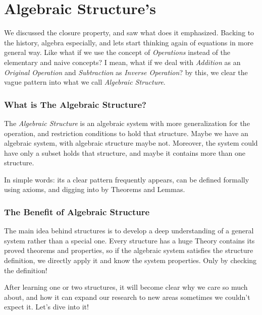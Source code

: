 \section{Algebraic Structure's}
We discussed the closure property, and saw what does it emphasized. Backing to the history, algebra especially, and lets start thinking again of equations in more general way. Like what if we use the concept of {\it Operations} instead of the elementary and naive concepts? I mean, what if we deal with {\it Addition} as an {\it Original Operation} and {\it Subtraction} as {\it Inverse Operation}? by this, we clear the vague pattern into what we call {\it Algebraic Structure}.

\subsubsection{What is The Algebraic Structure?}
The {\it Algebraic Structure} is an algebraic system with more generalization for the operation, and restriction conditions to hold that structure. Maybe we have an algebraic system, with algebraic structure maybe not. Moreover, the system could have only a subset holds that structure, and maybe it contains more than one structure.

In simple words: its a clear pattern frequently appears, can be defined formally using axioms, and digging into by Theorems and Lemmas.

\subsubsection{The Benefit of Algebraic Structure}
The main idea behind structures is to develop a deep understanding of a general system rather than a special one. Every structure has a huge Theory contains its proved theorems and properties, so if the algebraic system satisfies the structure definition, we directly apply it and know the system properties. Only by checking the definition!

After learning one or two structures, it will become clear why we care so much about, and how it can expand our research to new areas sometimes we couldn't expect it. Let's dive into it!